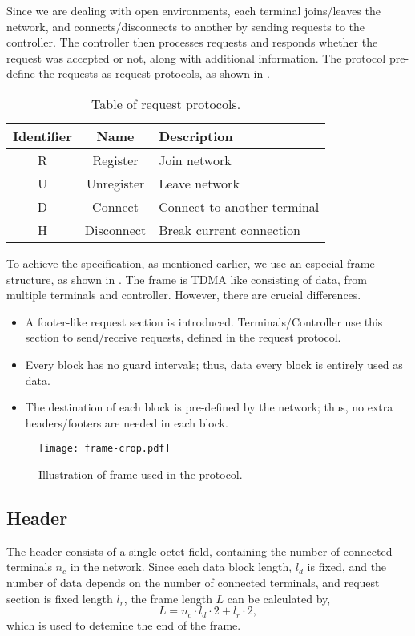 ﻿\documentclass[twocolumn,9pt]{ltjsarticle}
\renewcommand{\ref}{\Cref}
\begin{document}
Since we are dealing with open environments, each terminal joins/leaves the network, and connects/disconnects to another by sending requests to the controller.
The controller then processes requests and responds whether the request was accepted or not, along with additional information.
The protocol pre-define the requests as request protocols, as shown in \ref{tab:request}.

\begin{table}[tb]
  \centering
  \caption{\label{tab:request}
    Table of request protocols.
  }
  \begin{tabularx}{\linewidth}{ccl}
    \hline
    Identifier & Name & Description\\
    \hline \hline
    R & Register & Join network\\
    U & Unregister & Leave network\\
    D & Connect & Connect to another terminal\\
    H & Disconnect & Break current connection\\
    \hline
  \end{tabularx}
\end{table}

To achieve the specification, as mentioned earlier, we use an especial frame structure, as shown in \ref{fig:frame}.
The frame is TDMA like consisting of data, from multiple terminals and controller.
However, there are crucial differences.
\begin{itemize}
\item A footer-like request section is introduced.
  Terminals/Controller use this section to send/receive requests, defined in the request protocol.
\item Every block has no guard intervals; thus, data every block is entirely used as data.
\item The destination of each block is pre-defined by the network; thus, no extra headers/footers are needed in each block.
\end{itemize}

\begin{figure}[tb]
  \centering
  \texttt{[image: frame-crop.pdf]}
  \caption{\label{fig:frame}
    Illustration of frame used in the protocol.
  }
\end{figure}

\subsection{Header}
The header consists of a single octet field, containing the number of connected terminals $n_{c}$ in the network.
Since each data block length, $l_d$ is fixed, and the number of data depends on the number of connected terminals, and request section is fixed length $l_r$, the frame length $L$ can be calculated by,
\begin{equation}
  \label{}
  L = n_c \cdot l_d \cdot 2 + l_r \cdot 2,
\end{equation}
which is used to detemine the end of the frame.
\end{document}
